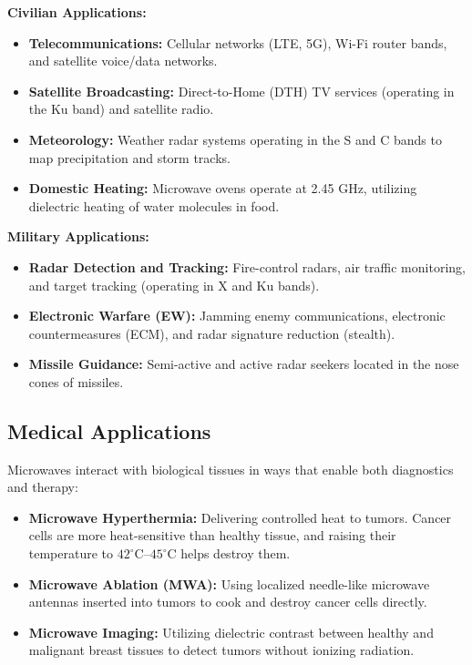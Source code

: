 \documentclass[12pt,a4paper]{article}
\begin{document}
\textbf{Civilian Applications:}
\begin{itemize}[leftmargin=*, itemsep=2pt]
  \item \textbf{Telecommunications:} Cellular networks (LTE, 5G), Wi-Fi router bands, and satellite voice/data networks.
  \item \textbf{Satellite Broadcasting:} Direct-to-Home (DTH) TV services (operating in the Ku band) and satellite radio.
  \item \textbf{Meteorology:} Weather radar systems operating in the S and C bands to map precipitation and storm tracks.
  \item \textbf{Domestic Heating:} Microwave ovens operate at 2.45 GHz, utilizing dielectric heating of water molecules in food.
\end{itemize}

\textbf{Military Applications:}
\begin{itemize}[leftmargin=*, itemsep=2pt]
  \item \textbf{Radar Detection and Tracking:} Fire-control radars, air traffic monitoring, and target tracking (operating in X and Ku bands).
  \item \textbf{Electronic Warfare (EW):} Jamming enemy communications, electronic countermeasures (ECM), and radar signature reduction (stealth).
  \item \textbf{Missile Guidance:} Semi-active and active radar seekers located in the nose cones of missiles.
\end{itemize}

\subsection{Medical Applications}
Microwaves interact with biological tissues in ways that enable both diagnostics and therapy:
\begin{itemize}[leftmargin=*, itemsep=3pt]
  \item \textbf{Microwave Hyperthermia:} Delivering controlled heat to tumors. Cancer cells are more heat-sensitive than healthy tissue, and raising their temperature to $42^\circ\text{C}$--$45^\circ\text{C}$ helps destroy them.
  \item \textbf{Microwave Ablation (MWA):} Using localized needle-like microwave antennas inserted into tumors to cook and destroy cancer cells directly.
  \item \textbf{Microwave Imaging:} Utilizing dielectric contrast between healthy and malignant breast tissues to detect tumors without ionizing radiation.
\end{itemize}
\end{document}
